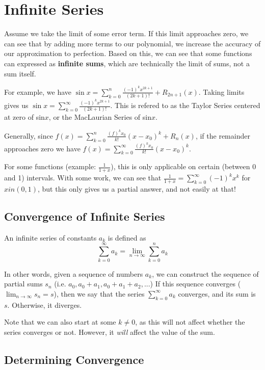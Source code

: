 \documentclass[12pt]{article}
\begin{document}
\section*{Infinite Series}
Assume we take the limit of some error term. If this limit approaches zero, we can see that by adding more terms to our polynomial, we increase the accuracy of our approximation to perfection. Based on this, we can see that some functions can expressed as {\bf infinite sums}, which are technically the limit of sums, not a sum itself.

For example, we have $\sin x = \displaystyle\sum_{k=0}^n \frac{(-1)^k x^{2k+1}}{(2k+1)!} + R_{2n+1}(x)$. Taking limits gives us $\sin x = \displaystyle\sum_{k=0}^\infty \frac{(-1)^k x^{2k+1}}{(2k+1)!}$. This is refered to as the Taylor Series centered at zero of sin$x$, or the MacLaurian Series of sin$x$.

Generally, since $f(x) = \displaystyle\sum_{k=0}^n \frac{(f)^k x_0}{k!}(x - x_0)^k + R_n(x)$, if the remainder approaches zero we have $f(x) = \displaystyle\sum_{k=0}^\infty \frac{(f)^k x_0}{k!}(x - x_0)^k$.

For some functions (example: $\frac{1}{1+x}$), this is only applicable on certain (between 0 and 1) intervals. With some work, we can see that $\frac{1}{1+x} = \displaystyle\sum_{k=0}^\infty (-1)^kx^k$ for $x in (0,1)$, but this only gives us a partial answer, and not easily at that!

\subsection*{Convergence of Infinite Series}
 An infinite series of constants $a_k$ is defined as \[ \sum_{k=0}^\infty a_k = \lim_{n\to\infty} \sum_{k=0}^n a_k \]

In other words, given a sequence of numbers $a_k$, we can construct the sequence of partial sums $s_n$ (i.e. $a_0, a_0 + a_1, a_0 + a_1 + a_2, ...$) If this sequence converges ($\lim_{n\to\infty} s_n = s$), then we say that the series $\displaystyle\sum_{k=0}^\infty a_k$ converges, and its sum is $s$. Otherwise, it diverges.

Note that we can also start at some $k \neq 0$, as this will not affect whether the series converges or not. However, it \emph{will} affect the value of the sum.

\subsection*{Determining Convergence}
\end{document}
